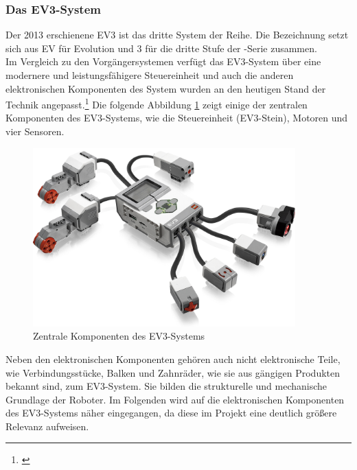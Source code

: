 \subsubsection{Das EV3-System}
\color{finishing}
Der 2013 erschienene EV3 ist das dritte System der \LM{} Reihe. Die Bezeichnung setzt sich aus EV für Evolution 
und 3 für die dritte Stufe der \LM{}-Serie zusammen. \\
Im Vergleich zu den Vorgängersystemen verfügt das EV3-System über eine modernere und leistungsfähigere Steuereinheit und auch die anderen elektronischen Komponenten des System wurden an den heutigen Stand der Technik 
angepasst.\footnote{\citep[vgl.][Das EV3 Roboter Universum, Seite 22]{Scholz.DasEV3}\label{note24}}
\medskip
\newline
Die folgende Abbildung \ref{fig:ev3system} zeigt einige der zentralen Komponenten des EV3-Systems, wie die Steuereinheit (EV3-Stein), Motoren und vier Sensoren.
\begin{figure}[ht]
	\centering
	\includegraphics[width=0.90\textwidth]{images/technische_grundlagen/EV3-Overview.png}
	\caption[Zentrale Komponenten des EV3-Systems]{Zentrale Komponenten des EV3-Systems}
	\label{fig:ev3system}
\end{figure}
\newline
Neben den elektronischen Komponenten gehören auch nicht elektronische Teile, wie Verbindungsstücke, Balken und Zahnräder, wie sie aus gängigen \LE{} Produkten bekannt sind, zum EV3-System. Sie bilden die strukturelle und mechanische Grundlage der Roboter.
\medskip
\newline
Im Folgenden wird auf die elektronischen Komponenten des EV3-Systems näher eingegangen, da diese im Projekt eine deutlich größere Relevanz aufweisen.

